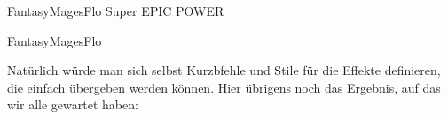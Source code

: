 \begin{bemerkung}
\begin{latex}[firstnumber=last,morekeywords={[5]{\\FantasyxCreateCardClass}}]
\begin{NewFantasyCard}{Fantasy}{Mages}{Flo}
{        {\scriptsize Super EPIC POWER}
    }
\end{NewFantasyCard}
    \end{latex}
    \begin{NewFantasyCard}{Fantasy}{Mages}{Flo}
    \end{NewFantasyCard}
    Natürlich würde man sich selbst Kurzbfehle und Stile für die Effekte definieren, die einfach übergeben werden können. Hier übrigens noch das Ergebnis, auf das wir alle gewartet haben: \begin{center}
        \Flo
    \end{center}
\end{bemerkung}